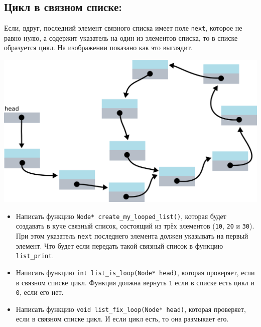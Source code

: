 \documentclass{article}
\begin{document}
\subsection*{Цикл в связном списке:}
Если, вдруг, последний элемент связного списка имеет поле \texttt{next}, которое не равно нулю, а содержит указатель на один из элементов списка, то в списке образуется цикл. На изображении показано как это выглядит. 
\begin{center}
\includegraphics[scale=0.77]{../images/list_loop_2.png}
\end{center}

\begin{itemize}
\item Написать функцию \texttt{Node* create\_my\_looped\_list()}, которая будет создавать в куче связный список, состоящий из трёх элементов (\texttt{10}, \texttt{20} и \texttt{30}). При этом указатель \texttt{next} последнего элемента должен указывать на первый элемент. Что будет если передать такой связный список в функцию \texttt{list\_print}.
\item Написать функцию \texttt{int list\_is\_loop(Node* head)}, которая проверяет, если в связном списке цикл. Функция должна вернуть \texttt{1} если в списке есть цикл и \texttt{0}, если его нет.
\item Написать функцию \texttt{void list\_fix\_loop(Node* head)}, которая проверяет, если в связном списке цикл. И если цикл есть, то она размыкает его.
\end{itemize}
\end{document}
